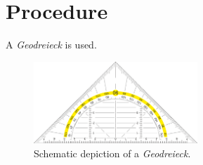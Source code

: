 \section{Procedure}
\label{sec:procedure}

A \emph{Geodreieck} is used.

\begin{figure}
	\label{fig:geodreieck}
	\centering
	\includegraphics[width=0.55\textwidth]{content/graphics/geodreieck.pdf}
	\caption{Schematic depiction of a \emph{Geodreieck}.}
\end{figure}
